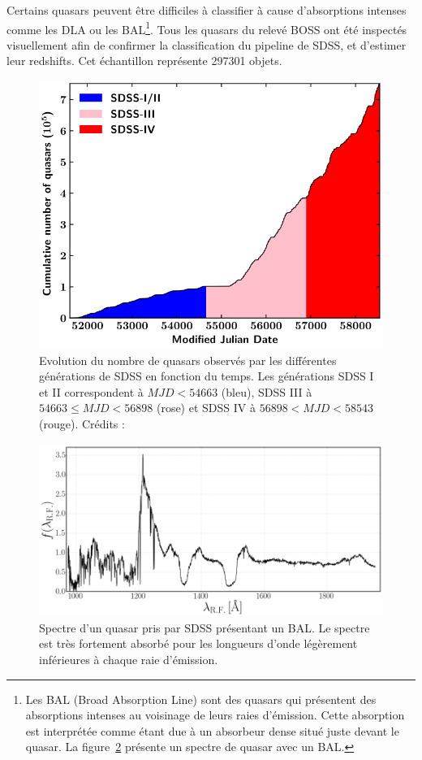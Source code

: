 Certains quasars peuvent être difficiles à classifier à cause d'absorptions intenses comme les DLA ou les BAL\footnote{Les BAL (Broad Absorption Line) sont des quasars qui présentent des absorptions intenses au voisinage de leurs raies d'émission. Cette absorption est interprétée comme étant due à un absorbeur dense situé juste devant le quasar. La figure~\ref{fig:exemple_bal} présente un spectre de quasar avec un BAL.}.
Tous les quasars du relevé BOSS ont été inspectés visuellement \autocite{Paris2016} afin de confirmer la classification du pipeline de SDSS, et d'estimer leur redshifts. Cet échantillon représente \num{297301} objets.
\begin{figure}
  \centering
  \includegraphics[scale=0.35]{quasar_number}
  \caption{Evolution du nombre de quasars observés par les différentes générations de SDSS en fonction du temps. Les générations SDSS I et II correspondent à $MJD < 54663$ (bleu), SDSS III à $54663 \leq MJD < 56898$ (rose) et SDSS IV à $56898 < MJD < 58543$ (rouge). Crédits : \textcite{Lyke2020}}
  \label{fig:quasar_number}
\end{figure}
\begin{figure}
  \centering
  \includegraphics[scale=0.4]{exemple_bal}
  \caption{Spectre d'un quasar pris par SDSS présentant un BAL. Le spectre est très fortement absorbé pour les longueurs d'onde légèrement inférieures à chaque raie d'émission.}
  \label{fig:exemple_bal}
\end{figure}
